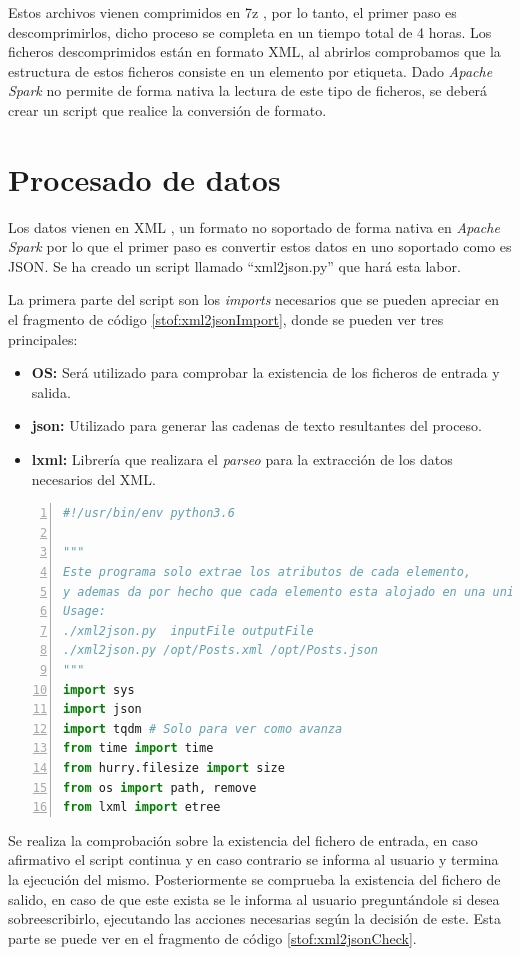 Estos archivos vienen comprimidos en 7z \cite{7z}, por lo tanto, el primer paso es descomprimirlos, dicho proceso se completa en un tiempo total de 4 horas. Los ficheros descomprimidos están en formato \gls{XML}, al abrirlos comprobamos que la estructura de estos ficheros consiste en un elemento por etiqueta. Dado \textit{Apache Spark} no permite de forma nativa la lectura de este tipo de ficheros, se deberá crear un script que realice la conversión de formato.

\section{Procesado de datos}
Los datos vienen en \gls{XML} \cite{XML}, un formato no soportado de forma nativa en \textit{Apache Spark} por lo que el primer paso es convertir estos datos en uno soportado como es \gls{JSON}. Se ha creado un script llamado ``xml2json.py'' que hará esta labor.

La primera parte del script son los \textit{imports} necesarios que se pueden apreciar en el fragmento de código \ref{stof:xml2jsonImport}, donde se pueden ver tres principales:
\begin{itemize}
	\item \textbf{OS:} Será utilizado para comprobar la existencia de los ficheros de entrada y salida.
	\item \textbf{json:} Utilizado para generar las cadenas de texto resultantes del proceso.
	\item \textbf{lxml:} Librería que realizara el \textit{parseo} para la extracción de los datos necesarios del \gls{XML}.
\end{itemize}
\begin{lstlisting}[label=stof:xml2jsonImport,language=Python,frame=single,caption=\textit{Imports} del script ``xml2json.py'' de procesado de \gls{XML}., firstnumber=1,numbers=left]
#!/usr/bin/env python3.6

"""
Este programa solo extrae los atributos de cada elemento,
y ademas da por hecho que cada elemento esta alojado en una unica linea
Usage: 
./xml2json.py  inputFile outputFile
./xml2json.py /opt/Posts.xml /opt/Posts.json
"""
import sys
import json
import tqdm # Solo para ver como avanza
from time import time
from hurry.filesize import size
from os import path, remove
from lxml import etree
\end{lstlisting}

Se realiza la comprobación sobre la existencia del fichero de entrada, en caso afirmativo el script continua y en caso contrario se informa al usuario y termina la ejecución del mismo. Posteriormente se comprueba la existencia del fichero de salido, en caso de que este exista se le informa al usuario preguntándole si desea sobreescribirlo, ejecutando las acciones necesarias según la decisión de este. Esta parte se puede ver en el fragmento de código \ref{stof:xml2jsonCheck}.

